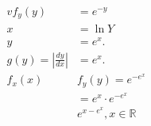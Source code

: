 $\begin{aligned} v f_{y}(y) &=e^{-y} \\ x &=\ln Y \\ y &=e^{x} . \\ g(y)=\left|\frac{d y}{d x}\right| &=e^{x} . \\ f_{x}(x) & f_{y}(y)=e^{-e^{x}} \\ &=e^{x} \cdot e^{-e^{x}} \\ & e^{x-e^{x}}, x \in \mathbb{R} \end{aligned}$